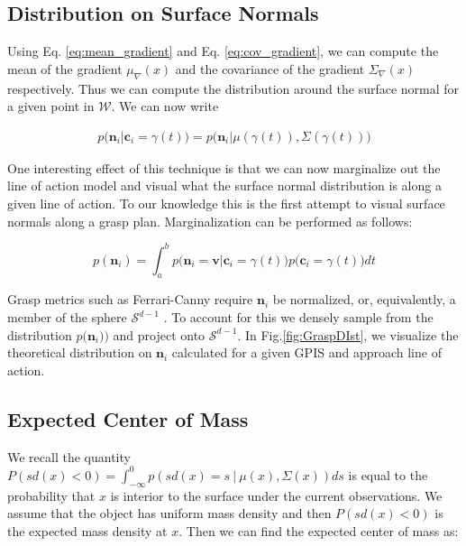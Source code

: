 \documentclass[letterpaper, 10 pt, conference]{ieeeconf}  %
\begin{document}
\subsection{Distribution on Surface Normals}\label{sec:normals} 
Using Eq. \ref{eq:mean_gradient} and Eq. \ref{eq:cov_gradient}, we can compute the mean of the gradient $ \mu_{\nabla}(x)$ and the covariance of the gradient $\Sigma_{\nabla}(x)$ respectively. Thus we can compute the distribution around the surface normal for a given point in $\mathcal{W}$. We can now write 

\vspace{-2ex}
\begin{align*}
p\big(\textbf{n}_i|\textbf{c}_i = \gamma(t)\big) = p\big(\textbf{n}_i |\mu(\gamma(t)), \Sigma(\gamma(t)) \big)
\end{align*}

One interesting effect of this technique is that we can now marginalize out the line of action model and visual what the surface normal distribution is along a given line of action. To our knowledge this is the first attempt to visual surface normals along a grasp plan. Marginalization can be performed as follows:

\vspace{-2ex}
\begin{equation}
p(\textbf{n}_i ) = \int_a^b   p\big(\textbf{n}_i = \textbf{v} | \textbf{c}_i = \gamma(t) \big)p\big(\textbf{c}_i = \gamma(t)\big) dt
\end{equation}

Grasp metrics such as  Ferrari-Canny require $\textbf{n}_i$ be normalized, or, equivalently, a member of the sphere $\mathcal{S}^{d-1}$ \cite{ferrari1992}. To account for this we densely sample from the  distribution $p \big(\textbf{n}_i ) \big)$  and project onto $\mathcal{S}^{d-1}$.  In Fig.\ref{fig:GraspDIst}, we visualize the theoretical distribution on $\textbf{n}_i$ calculated for a given GPIS and approach line of action.


\subsection{Expected Center of Mass}\label{sec:mass} 

We recall the quantity $P(sd(x) < 0) = \int_{-\infty}^{0} p(sd(x) =  s \ | \ \mu(x),\Sigma(x)) ds$ is equal to the probability that $x$ is interior to the surface under the current observations.
We assume that the object has uniform mass density and then $P(sd(x) < 0)$ is the expected mass density at $x$.
Then we can find the expected center of mass as:
\end{document}
